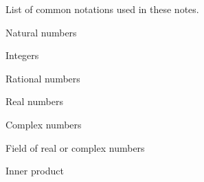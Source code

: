 %


List of common notations used in these notes.

\begin{description}[CABR] %
    \item[$\N$]{Natural numbers}
    \item[$\Z$]{Integers}
    \item[$\Q$]{Rational numbers}
    \item[$\R$]{Real numbers}
    \item[$\C$]{Complex numbers}
    \item[$\F$]{Field of real or complex numbers}
    \item[$\inner{\cdot}{\cdot}$]{Inner product}
\end{description}
